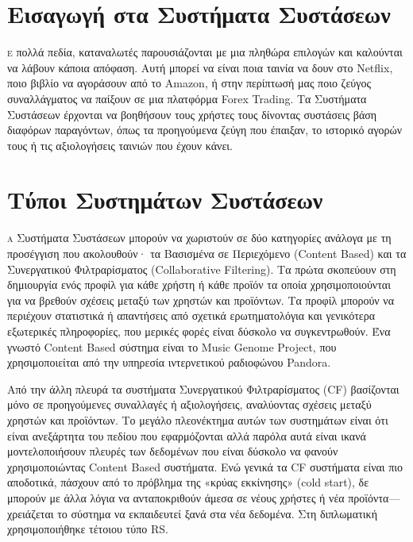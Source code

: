 


\section{Εισαγωγή στα Συστήματα Συστάσεων}

\lettrine[findent=2pt]{}{ε} πολλά πεδία, καταναλωτές παρουσιάζονται με μια πληθώρα επιλογών και καλούνται να λάβουν κάποια απόφαση. Αυτή μπορεί να είναι ποια ταινία να δουν στο Netflix, ποιο βιβλίο να αγοράσουν από το Amazon, ή στην περίπτωσή μας ποιο ζεύγος συναλλάγματος να παίξουν σε μια πλατφόρμα Forex Trading. Τα Συστήματα Συστάσεων έρχονται να βοηθήσουν τους χρήστες τους δίνοντας συστάσεις βάση διαφόρων παραγόντων, όπως τα προηγούμενα ζεύγη που έπαιξαν, το ιστορικό αγορών τους ή τις αξιολογήσεις ταινιών που έχουν κάνει. 

\section{Τύποι Συστημάτων Συστάσεων}

\lettrine[findent=2pt]{}{α} Συστήματα Συστάσεων μπορούν να χωριστούν σε δύο κατηγορίες ανάλογα με τη προσέγγιση που ακολουθούν· τα Βασισμένα σε Περιεχόμενο (Content Based) και τα Συνεργατικού Φιλτραρίσματος (Collaborative Filtering). Τα πρώτα σκοπεύουν στη δημιουργία ενός προφίλ για κάθε χρήστη ή κάθε προϊόν τα οποία χρησιμοποιούνται για να βρεθούν σχέσεις μεταξύ των χρηστών και προϊόντων. Τα προφίλ μπορούν να περιέχουν στατιστικά ή απαντήσεις από σχετικά ερωτηματολόγια και γενικότερα εξωτερικές πληροφορίες, που μερικές φορές είναι δύσκολο να συγκεντρωθούν. Ένα γνωστό Content Based σύστημα είναι το Music Genome Project, που χρησιμοποιείται από την υπηρεσία ιντερνετικού ραδιοφώνου Pandora.

Από την άλλη πλευρά τα συστήματα Συνεργατικού Φιλτραρίσματος (CF) βασίζονται μόνο σε προηγούμενες συναλλαγές ή αξιολογήσεις, αναλύοντας σχέσεις μεταξύ χρηστών και προϊόντων. Το μεγάλο πλεονέκτημα αυτών των συστημάτων είναι ότι είναι ανεξάρτητα του πεδίου που εφαρμόζονται αλλά παρόλα αυτά είναι ικανά μοντελοποιήσουν πλευρές των δεδομένων που είναι δύσκολο να φανούν χρησιμοποιώντας Content Based συστήματα. Ενώ γενικά τα CF συστήματα είναι πιο αποδοτικά, πάσχουν από το πρόβλημα της «κρύας εκκίνησης» (cold start), δε μπορούν με άλλα λόγια να ανταποκριθούν άμεσα σε νέους χρήστες ή νέα προϊόντα—χρειάζεται το σύστημα να εκπαιδευτεί ξανά στα νέα δεδομένα. Στη διπλωματική χρησιμοποιήθηκε τέτοιου τύπο RS.


